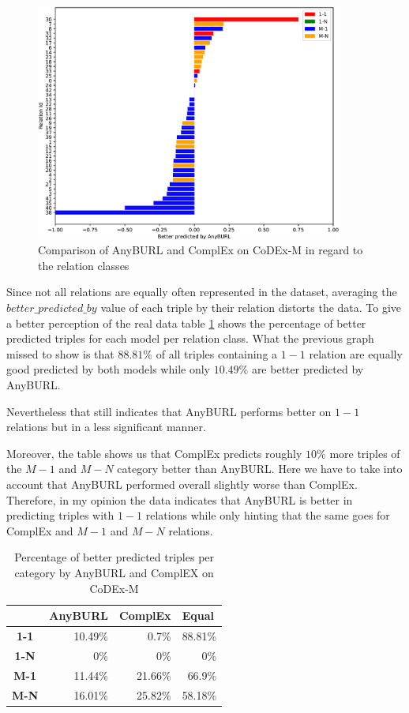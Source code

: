 \begin{figure}[H]
\centering
\includegraphics[width=0.9\textwidth]{images/relation_class_anyburl_complex_codex.PNG}
\caption{Comparison of AnyBURL and ComplEx on CoDEx-M in regard to the relation classes}
\label{fig:relation_class_anyburl_complex_codex}
\end{figure}

Since not all relations are equally often represented in the dataset, averaging the $better\_predicted\_by$ value of each triple by their relation distorts the data. To give a better perception of the real data table \ref{tab:relation_class_anyburl_complex_codex} shows the percentage of better predicted triples for each model per relation class. What the previous graph missed to show is that $88.81\%$ of all triples containing a $1-1$ relation are equally good predicted by both models while only $10.49\%$ are better predicted by AnyBURL. 

Nevertheless that still indicates that AnyBURL performs better on $1-1$ relations but in a less significant manner. 

Moreover, the table shows us that ComplEx predicts roughly $10\%$ more triples of the $M-1$ and $M-N$ category better than AnyBURL. Here we have to take into account that AnyBURL performed overall slightly worse than ComplEx. Therefore, in my opinion the data indicates that AnyBURL is better in predicting triples with $1-1$ relations while only hinting that the same goes for ComplEx and $M-1$ and $M-N$ relations.

\begin{table}[H]
\centering
\begin{tabular}{c|rrr}
\multicolumn{1}{l|}{} & \multicolumn{1}{c}{\textbf{AnyBURL}} & \multicolumn{1}{c}{\textbf{ComplEx}} & \multicolumn{1}{l}{\textbf{Equal}} \\ \hline
\textbf{1-1} & 10.49\% & 0.7\% & 88.81\% \\
\textbf{1-N} & 0\% & 0\% & 0\% \\
\textbf{M-1} & 11.44\% & 21.66\% & 66.9\% \\
\textbf{M-N} & 16.01\% & 25.82\% & 58.18\%
\end{tabular}
\caption{Percentage of better predicted triples per category by AnyBURL and ComplEX on CoDEx-M}
\label{tab:relation_class_anyburl_complex_codex}
\end{table}

